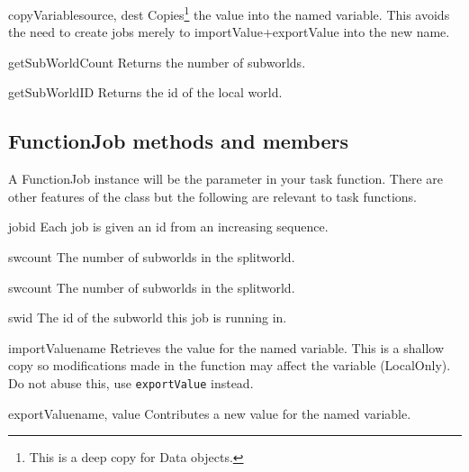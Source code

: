 \begin{methoddesc}[SplitWorld]{copyVariable}{source, dest}
Copies\footnote{ This is a deep copy for Data objects.} the value into the named variable.
This avoids the need to create jobs merely to importValue+exportValue into the new name.
\end{methoddesc}

\begin{methoddesc}[SplitWorld]{getSubWorldCount}{}
Returns the number of subworlds.
\end{methoddesc}

\begin{methoddesc}[SplitWorld]{getSubWorldID}{}
Returns the id of the local world.
\end{methoddesc}

\subsection{FunctionJob methods and members}
A FunctionJob instance will be the  parameter in your task function.
There are other features of the class but the following are relevant to task functions.


\begin{memberdesc}[FunctionJob]{jobid}
Each job is given an id from an increasing sequence.
\end{memberdesc}

\begin{memberdesc}[FunctionJob]{swcount}
The number of subworlds in the splitworld. 
\end{memberdesc}

\begin{memberdesc}[FunctionJob]{swcount}
The number of subworlds in the splitworld. 
\end{memberdesc}

\begin{memberdesc}[FunctionJob]{swid}
The id of the subworld this job is running in.
\end{memberdesc}

\begin{methoddesc}[FunctionJob]{importValue}{name}
Retrieves the value for the named variable.
This is a shallow copy so modifications made in the function may affect the variable (LocalOnly). 
Do not abuse this, use \texttt{exportValue} instead.
\end{methoddesc}

\begin{methoddesc}[FunctionJob]{exportValue}{name, value}
Contributes a new value for the named variable.
\end{methoddesc}
